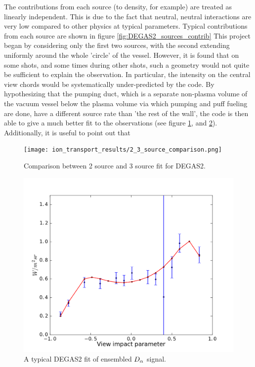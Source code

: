 The contributions from each source (to density, for example) are treated as linearly independent. This is due to the fact that neutral, neutral interactions are very low compared to other physics at typical parameters. Typical contributions from each source are shown in figure \ref{fig:DEGAS2_sources_contrib} This project began by considering only the first two sources, with the second extending uniformly around the whole 'circle' of the vessel. However, it is found that on some shots, and some times during other shots, such a geometry would not quite be sufficient to explain the observation. In particular, the intensity on the central view chords would be systematically under-predicted by the code. By hypothesizing that the pumping duct, which is a separate non-plasma volume of the vacuum vessel below the plasma volume via which pumping and puff fueling are done, have a different source rate than 'the rest of the wall', the code is then able to give a much better fit to the observations (see figure \ref{fig:DEGAS2_2_3_source_comp}, and \ref{fig:DEGAS2_typical_fit}). Additionally, it is useful to point out that
\begin{figure}
	\centering
	\texttt{[image: ion\_transport\_results/2\_3\_source\_comparison.png]}
	\caption[Comparison between 2 source and 3 source fit for DEGAS2]{Comparison between 2 source and 3 source fit for DEGAS2.}\label{fig:DEGAS2_2_3_source_comp}
\end{figure}

\begin{figure}
    \centering
    \includegraphics{ion_transport_results/DEGAS2_typical_fit.png}
    \caption{A typical DEGAS2 fit of ensembled $D_{\alpha}$ signal.}
    \label{fig:DEGAS2_typical_fit}
\end{figure}

